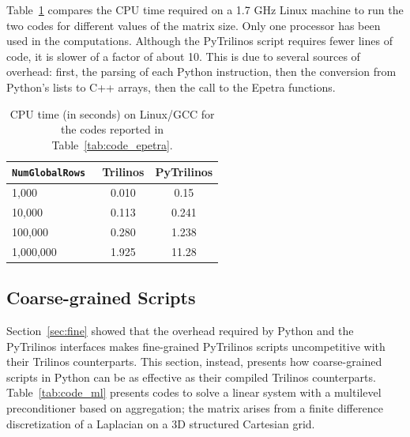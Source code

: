 \documentclass[acmtocl]{acmtrans2m}
\begin{document}
Table~\ref{tab:time_epetra} compares the CPU time required on a 1.7
GHz Linux machine to run the two codes for different values of the
matrix size. Only one processor has been used in the computations.
Although the PyTrilinos script requires fewer lines of code, it is
slower of a factor of about 10. This is due to several sources of
overhead: first, the parsing of each Python instruction, then the
conversion from Python's lists to C++ arrays, then the call to the
Epetra functions.

\begin{table}
  \begin{center}
    \begin{tabular}{| l | c | c |}
      \hline
      \tt NumGlobalRows & Trilinos & PyTrilinos \\
      \hline
      1,000     & 0.010 & 0.15  \\
      10,000    & 0.113 & 0.241 \\
      100,000   & 0.280 & 1.238 \\
      1,000,000 & 1.925 & 11.28 \\
      \hline
    \end{tabular}
    \caption{CPU time (in seconds) on Linux/GCC for the codes reported
      in Table~\ref{tab:code_epetra}.}
    \label{tab:time_epetra}
  \end{center}
\end{table}

\subsection{Coarse-grained Scripts}
\label{sec:coarse}

Section~\ref{sec:fine} showed that the overhead required by Python and
the PyTrilinos interfaces makes fine-grained PyTrilinos scripts
uncompetitive with their Trilinos counterparts. This section, instead,
presents how coarse-grained scripts in Python can be as effective as
their compiled Trilinos counterparts.  Table~\ref{tab:code_ml}
presents codes to solve a linear system with a multilevel
preconditioner based on aggregation; the matrix arises from a finite
difference discretization of a Laplacian on a 3D structured Cartesian
grid.
\end{document}
